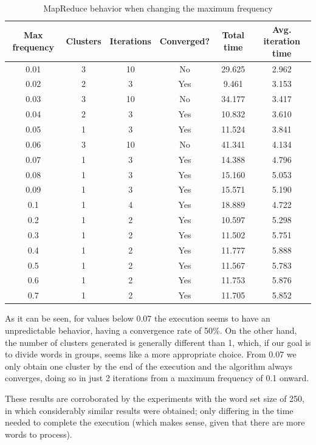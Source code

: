 \begin{table}[h!]
\begin{tabular}{||c c c c c c||}
 \hline
 Max frequency & Clusters & Iterations & Converged? & Total time & Avg. iteration time \\ [0.5ex]
 \hline\hline
 0.01 & 3 & 10 & No & 29.625 & 2.962 \\
 \hline
 0.02 & 2 & 3 & Yes & 9.461 & 3.153 \\
 \hline
 0.03 & 3 & 10 & No & 34.177 & 3.417 \\
 \hline
 0.04 & 2 & 3 & Yes & 10.832 & 3.610 \\
 \hline
 0.05 & 1 & 3 & Yes & 11.524 & 3.841 \\
 \hline
 0.06 & 3 & 10 & No & 41.341 & 4.134 \\
 \hline
 0.07 & 1 & 3 & Yes &  14.388 & 4.796\\
 \hline
 0.08 & 1 & 3 & Yes & 15.160 & 5.053 \\
 \hline
 0.09 & 1 & 3 & Yes & 15.571 & 5.190 \\
 \hline
 0.1 & 1 & 4 & Yes & 18.889	& 4.722 \\
 \hline
 0.2 & 1 & 2 & Yes & 10.597 & 5.298 \\
 \hline
 0.3 & 1 & 2 & Yes & 11.502 & 5.751 \\
 \hline
 0.4 & 1 & 2 & Yes & 11.777 & 5.888 \\
 \hline
 0.5 & 1 & 2 & Yes & 11.567 & 5.783 \\
 \hline
 0.6 & 1 & 2 & Yes & 11.753 & 5.876 \\
 \hline
 0.7 & 1 & 2 & Yes & 11.705 & 5.852 \\
 \hline
\end{tabular}
\caption{MapReduce behavior when changing the maximum frequency}
\end{table}

As it can be seen, for values below 0.07 the execution seems to have an unpredictable behavior, having a convergence rate of 50\%. On the other hand, the number of clusters generated is generally different than 1, which, if our goal is to divide words in groups, seems like a more appropriate choice. From 0.07 we only obtain one cluster by the end of the execution and the algorithm always converges, doing so in just 2 iterations from a maximum frequency of 0.1 onward.

These results are corroborated by the experiments with the word set size of 250, in which considerably similar results were obtained; only differing in the time needed to complete the execution (which makes sense, given that there are more words to process).

